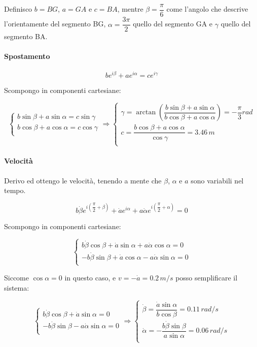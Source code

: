 \documentclass[main.tex]{subfiles}
\begin{document}
Definisco $b = BG$, $a = GA$ e $c = BA$, mentre $\beta = \dfrac{\pi}{6}$ come l'angolo che descrive l'orientamente del segmento BG, $\alpha = \dfrac{3\pi}{2}$ quello del segmento GA e $\gamma$ quello del segmento BA.

\paragraph{Spostamento}

\[
	be^{i\beta} + ae^{i\alpha} = ce^{i\gamma}
\]

Scompongo in componenti cartesiane:

\[
	\begin{cases}
		b\sin\beta + a\sin\alpha = c\sin\gamma\\
		b\cos\beta + a\cos\alpha = c\cos\gamma\\
	\end{cases}
	\Longrightarrow
	\begin{cases}
		\gamma = \arctan\left (\dfrac{b\sin\beta + a\sin\alpha}{b\cos\beta + a\cos\alpha}\right ) = -\dfrac{\pi}{3}rad\\
		c = \dfrac{b\cos\beta + a\cos\alpha}{\cos\gamma}=3.46\,m\\
	\end{cases}
\]

\paragraph{Velocità} Derivo ed ottengo le velocità, tenendo a mente che $\beta$, $\alpha$ e $a$ sono variabili nel tempo.

\[
	b\dot{\beta}e^{i\left ( \dfrac{\pi}{2} + \beta \right )} + \dot{a}e^{i\alpha} + a\dot{\alpha}e^{i\left ( \dfrac{\pi}{2} + \alpha \right )} = 0
\]

Scompongo in componenti cartesiane:

\[
\begin{cases}
	b\dot{\beta}\cos\beta + \dot{a}\sin\alpha + a\dot{\alpha}\cos\alpha = 0 \\
	- b\dot{\beta}\sin\beta + \dot{a}\cos\alpha - a\dot{\alpha}\sin\alpha = 0 \\
\end{cases}
\]

Siccome $\cos\alpha = 0$ in questo caso, e $v = -\dot{a} = 0.2\,m/s$  posso semplificare il sistema:

\[
\begin{cases}
	b\dot{\beta}\cos\beta + \dot{a}\sin\alpha = 0 \\
	- b\dot{\beta}\sin\beta - a\dot{\alpha}\sin\alpha = 0 \\
\end{cases}
\Longrightarrow
\begin{cases}
	\dot{\beta} = \dfrac{\dot{a}\sin\alpha}{b\cos\beta} = 0.11\,rad/s \\
	 \dot{\alpha}= -\dfrac{b\dot{\beta}\sin\beta}{a\sin\alpha} = 0.06\,rad/s \\
\end{cases}
\]
\end{document}
